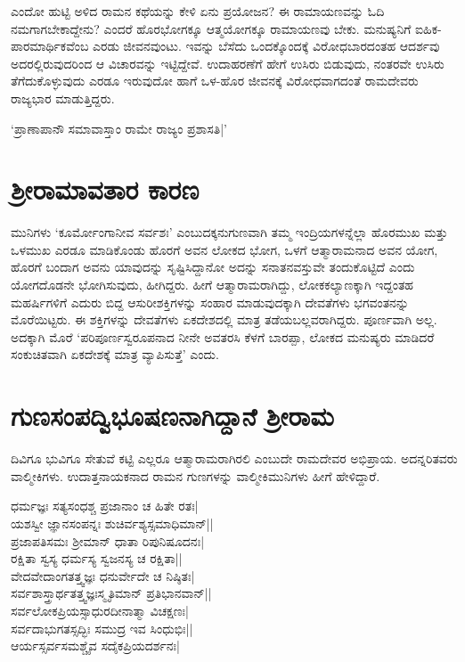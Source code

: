ಎಂದೋ ಹುಟ್ಟಿ ಅಳಿದ ರಾಮನ ಕಥೆಯನ್ನು ಕೇಳಿ ಏನು ಪ್ರಯೋಜನ? ಈ ರಾಮಾಯಣವನ್ನು ಓದಿ ನಮಗಾಗಬೇಕಾದ್ದೇನು? ಎಂದರೆ ಹೊರಭೋಗಕ್ಕೂ ಆತ್ಮಯೋಗಕ್ಕೂ ರಾಮಾಯಣವು ಬೇಕು. ಮನುಷ್ಯನಿಗೆ ಐಹಿಕ-ಪಾರಮಾರ್ಥಿಕವೆಂಬ ಎರಡು ಜೀವನವುಂಟು. ಇವನ್ನು ಬೆಸೆದು ಒಂದಕ್ಕೊಂದಕ್ಕೆ ವಿರೋಧಬಾರದಂತಹ ಆದರ್ಶವು ಅದರಲ್ಲಿರುವುದರಿಂದ ಆ‌ ವಿಚಾರವನ್ನು ಇಟ್ಟಿದ್ದೇವೆ. ಉದಾಹರಣೆಗೆ ಹೇಗೆ ಉಸಿರು ಬಿಡುವುದು, ನಂತರವೇ ಉಸಿರು ತೆಗೆದುಕೊಳ್ಳುವುದು ಎರಡೂ ಇರುವುದೋ ಹಾಗೆ ಒಳ-ಹೊರ ಜೀವನಕ್ಕೆ ವಿರೋಧವಾಗದಂತೆ ರಾಮದೇವರು ರಾಜ್ಯಭಾರ ಮಾಡುತ್ತಿದ್ದರು.

\begin{shloka}
`ಪ್ರಾಣಾಪಾನೌ ಸಮಾವಾಸ್ತಾಂ ರಾಮೇ ರಾಜ್ಯಂ ಪ್ರಶಾಸತಿ|'\label{222a}
\end{shloka}

\section*{ಶ್ರೀರಾಮಾವತಾರ ಕಾರಣ}

ಮುನಿಗಳು `ಕೂರ್ಮೋಂಗಾನೀವ ಸರ್ವಶಃ'\label{222} ಎಂಬುದಕ್ಕನುಗುಣವಾಗಿ ತಮ್ಮ ಇಂದ್ರಿಯಗಳನ್ನೆಲ್ಲಾ ಹೊರಮುಖ ಮತ್ತು ಒಳಮುಖ ಎರಡೂ ಮಾಡಿಕೊಂಡು ಹೊರಗೆ ಅವನ ಲೋಕದ ಭೋಗ, ಒಳಗೆ ಆತ್ಮಾರಾಮನಾದ ಅವನ ಯೋಗ, ಹೊರಗೆ ಬಂದಾಗ ಅವನು ಯಾವುದನ್ನು ಸೃಷ್ಟಿಸಿದ್ದಾನೋ ಅದನ್ನು ಸನಾತನವಸ್ತುವೇ ತಂದುಕೊಟ್ಟಿದೆ ಎಂದು ಯೋಗದೊಡನೇ ಭೋಗಿಸುವುದು, ಹೀಗಿದ್ದರು. ಹೀಗೆ ಆತ್ಮಾರಾಮರಾಗಿದ್ದು, ಲೋಕಕಲ್ಯಾಣಕ್ಕಾಗಿ ಇದ್ದಂತಹ ಮಹರ್ಷಿಗಳಿಗೆ ಎದುರು ಬಿದ್ದ ಆಸುರೀಶಕ್ತಿಗಳನ್ನು ಸಂಹಾರ ಮಾಡುವುದಕ್ಕಾಗಿ ದೇವತೆಗಳು ಭಗವಂತನನ್ನು ಮೊರೆಯಿಟ್ಟರು. ಈ ಶಕ್ತಿಗಳನ್ನು ದೇವತೆಗಳು ಏಕದೇಶದಲ್ಲಿ ಮಾತ್ರ ತಡೆಯಬಲ್ಲವರಾಗಿದ್ದರು. ಪೂರ್ಣವಾಗಿ ಅಲ್ಲ. ಅದಕ್ಕಾಗಿ ಮೊರೆ `ಪರಿಪೂರ್ಣಸ್ವರೂಪನಾದ ನೀನೇ ಅವತರಸಿ ಕೆಳಗೆ ಬಾರಪ್ಪಾ, ಲೋಕದ ಮನುಷ್ಯರು ಮಾಡಿದರೆ ಸಂಕುಚಿತವಾಗಿ ಏಕದೇಶಕ್ಕೆ ಮಾತ್ರ ವ್ಯಾಪಿಸುತ್ತೆ' ಎಂದು.

\section*{ಗುಣಸಂಪದ್ವಿಭೂಷಣನಾಗಿದ್ದಾನೆ ಶ್ರೀರಾಮ}

ದಿವಿಗೂ ಭುವಿಗೂ ಸೇತುವೆ ಕಟ್ಟಿ ಎಲ್ಲರೂ ಆತ್ಮಾರಾಮರಾಗಿರಲಿ ಎಂಬುದೇ ರಾಮದೇವರ ಅಭಿಪ್ರಾಯ. ಅದನ್ನರಿತವರು ವಾಲ್ಮೀಕಿಗಳು. ಉದಾತ್ತನಾಯಕನಾದ ರಾಮನ ಗುಣಗಳನ್ನು ವಾಲ್ಮೀಕಿಮುನಿಗಳು ಹೀಗೆ ಹೇಳಿದ್ದಾರೆ.

\begin{shloka}
ಧರ್ಮಜ್ಞಃ ಸತ್ಯಸಂಧಶ್ಚ ಪ್ರಜಾನಾಂ ಚ ಹಿತೇ ರತಃ|\label{223}\\
ಯಶಸ್ವೀ ಜ್ಞಾನಸಂಪನ್ನಃ ಶುಚಿರ್ವಶ್ಯಸ್ಸಮಾಧಿಮಾನ್||\\
ಪ್ರಜಾಪತಿಸಮಃ ಶ್ರೀಮಾನ್ ಧಾತಾ ರಿಪುನಿಷೂದನಃ|\\
ರಕ್ಷಿತಾ ಸ್ವಸ್ಯ ಧರ್ಮಸ್ಯ ಸ್ವಜನಸ್ಯ ಚ ರಕ್ಷಿತಾ||\\
ವೇದವೇದಾಂಗತತ್ತ್ವಜ್ಞಃ ಧನುರ್ವೇದೇ ಚ ನಿಷ್ಠಿತಃ|\\
ಸರ್ವಶಾಸ್ತ್ರಾರ್ಥತತ್ತ್ವಜ್ಞಃಸ್ಮೃತಿಮಾನ್ ಪ್ರತಿಭಾನವಾನ್||\\
ಸರ್ವಲೋಕಪ್ರಿಯಸ್ಸಾಧುರದೀನಾತ್ಮಾ ವಿಚಕ್ಷಣಃ|\\
ಸರ್ವದಾಭುಗತಸ್ಸದ್ಭಿಃ ಸಮುದ್ರ ಇವ ಸಿಂಧುಭಿಃ||\\
ಆರ್ಯಸ್ಸರ್ವಸಮಶ್ಚೈವ ಸದೈಕಪ್ರಿಯದರ್ಶನಃ|
\end{shloka}

